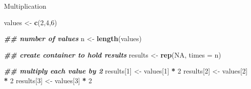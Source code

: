 \documentclass[
  ignorenonframetext,
]{beamer}
\newenvironment{Shaded}{\begin{snugshade}}{\end{snugshade}}
\newcommand{\AttributeTok}[1]{\textcolor[rgb]{0.13,0.29,0.53}{#1}}
\newcommand{\ConstantTok}[1]{\textcolor[rgb]{0.56,0.35,0.01}{#1}}
\newcommand{\DecValTok}[1]{\textcolor[rgb]{0.00,0.00,0.81}{#1}}
\newcommand{\DocumentationTok}[1]{\textcolor[rgb]{0.56,0.35,0.01}{\textbf{\textit{#1}}}}
\newcommand{\FunctionTok}[1]{\textcolor[rgb]{0.13,0.29,0.53}{\textbf{#1}}}
\newcommand{\NormalTok}[1]{#1}
\newcommand{\OtherTok}[1]{\textcolor[rgb]{0.56,0.35,0.01}{#1}}
\newcommand{\SpecialCharTok}[1]{\textcolor[rgb]{0.81,0.36,0.00}{\textbf{#1}}}
\begin{document}
\begin{frame}[fragile,t]{Multiplication}
\label{multiplication-4}
\footnotesize

\begin{Shaded}
\begin{Highlighting}[]
\NormalTok{values }\OtherTok{\textless{}{-}} \FunctionTok{c}\NormalTok{(}\DecValTok{2}\NormalTok{,}\DecValTok{4}\NormalTok{,}\DecValTok{6}\NormalTok{)}

\DocumentationTok{\#\# number of values}
\NormalTok{n }\OtherTok{\textless{}{-}} \FunctionTok{length}\NormalTok{(values)}

\DocumentationTok{\#\# create container to hold results}
\NormalTok{results }\OtherTok{\textless{}{-}} \FunctionTok{rep}\NormalTok{(}\ConstantTok{NA}\NormalTok{, }\AttributeTok{times =}\NormalTok{ n)}

\DocumentationTok{\#\# multiply each value by 2}
\NormalTok{results[}\DecValTok{1}\NormalTok{] }\OtherTok{\textless{}{-}}\NormalTok{ values[}\DecValTok{1}\NormalTok{] }\SpecialCharTok{*} \DecValTok{2}
\NormalTok{results[}\DecValTok{2}\NormalTok{] }\OtherTok{\textless{}{-}}\NormalTok{ values[}\DecValTok{2}\NormalTok{] }\SpecialCharTok{*} \DecValTok{2}
\NormalTok{results[}\DecValTok{3}\NormalTok{] }\OtherTok{\textless{}{-}}\NormalTok{ values[}\DecValTok{3}\NormalTok{] }\SpecialCharTok{*} \DecValTok{2}
\end{Highlighting}
\end{Shaded}
\end{frame}
\end{document}
